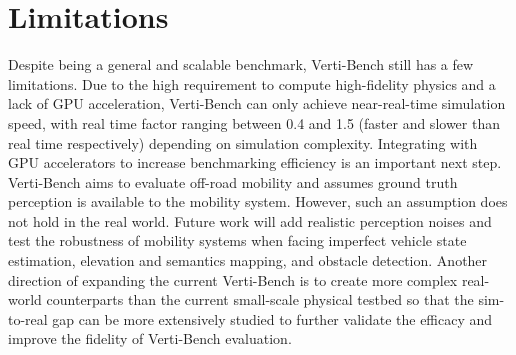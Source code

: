 \section{Limitations}
\label{sec::limitations}
Despite being a general and scalable benchmark, Verti-Bench still has a few limitations. 
Due to the high requirement to compute high-fidelity physics and a lack of GPU acceleration, Verti-Bench can only achieve near-real-time simulation speed, with real time factor ranging between 0.4 and 1.5 (faster and slower than real time respectively) depending on simulation complexity. Integrating with GPU accelerators to increase benchmarking efficiency is an important next step. 
Verti-Bench aims to evaluate off-road mobility and assumes ground truth perception is available to the mobility system. However, such an assumption does not hold in the real world. Future work will add realistic perception noises and test the robustness of mobility systems when facing imperfect vehicle state estimation, elevation and semantics mapping, and obstacle detection. Another direction of expanding the current Verti-Bench is to create more complex real-world counterparts than the current small-scale physical testbed so that the sim-to-real gap can be more extensively studied to further validate the efficacy and improve the fidelity of Verti-Bench evaluation. 